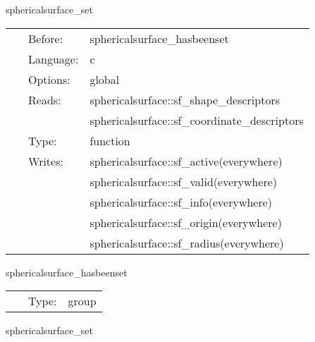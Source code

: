 
\hspace{5mm} sphericalsurface\_set 

\hspace{5mm}{\it set surface radii to be used for initial setup in other thorns } 


\hspace{5mm}

 \begin{tabular*}{160mm}{cll} 
~ & Before:  & sphericalsurface\_hasbeenset \\ 
~ & Language:  & c \\ 
~ & Options:  & global \\ 
~ & Reads:  & sphericalsurface::sf\_shape\_descriptors \\ 
~& ~ &sphericalsurface::sf\_coordinate\_descriptors\\ 
~ & Type:  & function \\ 
~ & Writes:  & sphericalsurface::sf\_active(everywhere) \\ 
~& ~ &sphericalsurface::sf\_valid(everywhere)\\ 
~& ~ &sphericalsurface::sf\_info(everywhere)\\ 
~& ~ &sphericalsurface::sf\_origin(everywhere)\\ 
~& ~ &sphericalsurface::sf\_radius(everywhere)\\ 
\end{tabular*} 


\vspace{5mm}


\hspace{5mm} sphericalsurface\_hasbeenset 

\hspace{5mm}{\it set the spherical surfaces before this group, and use it afterwards } 


\hspace{5mm}

 \begin{tabular*}{160mm}{cll} 
~ & Type:  & group \\ 
\end{tabular*} 


\vspace{5mm}


\hspace{5mm} sphericalsurface\_set 


